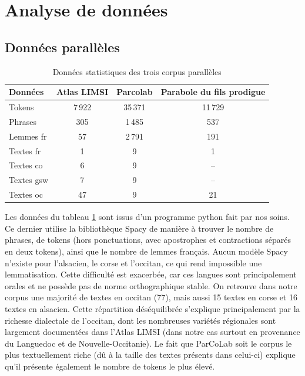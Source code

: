 \section{Analyse de données}

\subsection{Données parallèles}

\begin{table}[h!]
\centering
\begin{tabular}{lccc}
\hline
\textbf{Données} & \textbf{Atlas LIMSI} & \textbf{Parcolab} & \textbf{Parabole du fils prodigue} \\
\hline
Tokens & 7\,922 & 35\,371 & 11\,729 \\
Phrases & 305 & 1\,485 & 537 \\
Lemmes fr & 57 & 2\,791 & 191 \\
Textes fr & 1 & 9 & 1 \\
Textes co & 6 & 9 & -- \\
Textes gsw & 7 & 9 & -- \\
Textes oc & 47 & 9 & 21 \\
\hline
\end{tabular}
\caption{Données statistiques des trois corpus parallèles}
\label{table_donnees_para}
\end{table}

Les données du tableau \ref{table_donnees_para} sont issus d'un programme python fait par nos soins.
Ce dernier utilise la bibliothèque Spacy de manière à trouver le nombre
de phrases, de tokens (hors ponctuations, avec apostrophes et contractions séparés en deux tokens),
ainsi que le nombre de lemmes français. Aucun modèle Spacy n'existe pour l'alsacien, le corse et l'occitan,
ce qui rend impossible une lemmatisation. Cette difficulté est exacerbée, car ces langues sont principalement orales
et ne possède pas de norme orthographique stable.
On retrouve dans notre corpus une majorité de textes en occitan (77), mais aussi 15 textes en corse et 16
textes en alsacien. Cette répartition déséquilibrée s'explique principalement par la richesse dialectale de
l'occitan, dont les nombreuses variétés régionales sont largement documentées dans l'Atlas LIMSI
(dans notre cas surtout en provenance du Languedoc et de Nouvelle-Occitanie).
Le fait que ParCoLab soit le corpus le plus textuellement riche (dû à la taille des textes
présents dans celui-ci) explique qu’il présente également le nombre de tokens le plus élevé.

